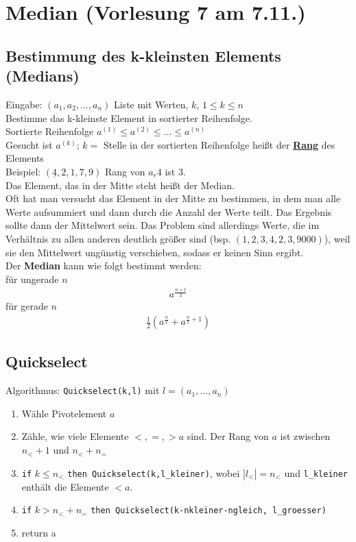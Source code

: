 \section{Median \tiny (Vorlesung 7 am 7.11.)}
\subsection{Bestimmung des k-kleinsten Elements (Medians)}

Eingabe: $(a_1, a_2, \dots	, a_n)$ Liste mit Werten, $k$, $1\leq k \leq n$\\
Bestimme das k-kleinste Element in sortierter Reihenfolge.\\
Sortierte Reihenfolge $a^{(1)} \leq a^{(2)} \leq \dots \leq a^{(n)}$\\
Gesucht ist $a^{(k)}$; $k=$ Stelle in der sortierten Reihenfolge heißt der \underline{\textbf{Rang}} des Elements\\
Beispiel: $(\underline{4},2,1,7,9)$ Rang von $a_r 4 $ ist $3$.\\
Das Element, das in der Mitte steht heißt der Median.\\
Oft hat man versucht das Element in der Mitte zu bestimmen, in dem man alle Werte aufsummiert und dann durch die Anzahl der Werte teilt. Das Ergebnis sollte dann der Mittelwert sein. Das Problem sind allerdings Werte, die im Verhältnis zu allen anderen deutlich größer sind (bsp. $(1,2,3,4,2,3,9000)$), weil sie den Mittelwert ungünstig verschieben, sodass er keinen Sinn ergibt.\\

Der \textbf{Median} kann wie folgt bestimmt werden:\\
für ungerade $n$
\begin{align*}
a^{\frac{n+1}{2}}
\end{align*}
für gerade $n$
\begin{align*}
\frac{1}{2}(a^{\frac{n}{2}} + a^{\frac{n}{2}+1})
\end{align*}

\subsection{Quickselect}
Algorithmus: \lstinline!Quickselect(k,l)! mit $l=(a_1,...,a_n)$
\begin{enumerate}
\item Wähle Pivotelement $a$
\item Zähle, wie viele Elemente $<,=,> a$ sind.
Der Rang von $a$ ist zwischen $n_< +1$ und $n_< + n_=$
\item \lstinline!if! $k\leq n_<$ \lstinline!then Quickselect(k,l_kleiner)!, wobei $|l_<| = n_<$ und \lstinline!l_kleiner! enthält die Elemente $<a$.
\item \lstinline!if! $k > n_< + n_=$ \lstinline!then Quickselect(k-nkleiner-ngleich, l_groesser)!
\item return a
\end{enumerate}
